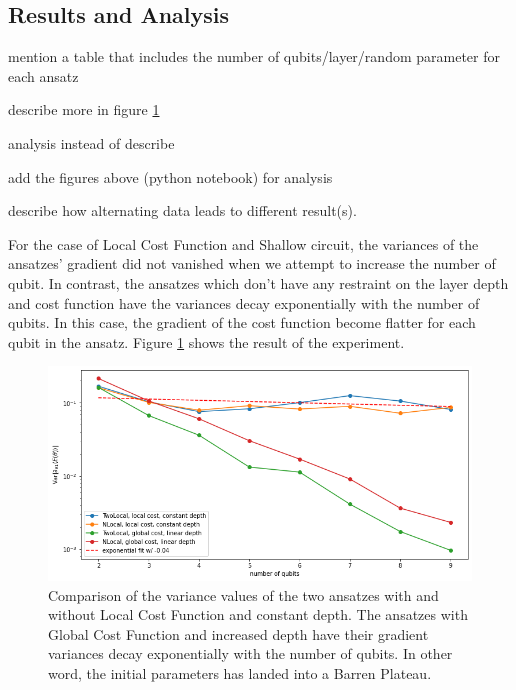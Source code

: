 \subsection{Results and Analysis}

\begin{todolist}
\item mention a table that includes the number of qubits/layer/random parameter for each ansatz
\item describe more in figure \ref{Variance Local Cost}
\item analysis instead of describe
\item add the figures above (python notebook) for analysis
\item describe how alternating data leads to different result(s).
\end{todolist}

For the case of Local Cost Function and Shallow circuit, the variances of the ansatzes' gradient did not vanished when we attempt to increase the number of qubit.
In contrast, the ansatzes which don't have any restraint on the layer depth and cost function have the variances decay exponentially with the number of qubits.
In this case, the gradient of the cost function become flatter for each qubit in the ansatz.
Figure \ref{Variance Local Cost} shows the result of the experiment.

\begin{figure}
    \includegraphics[width=\textwidth]{Artefact/Appendices/variancesLCF.png}
    \caption{
        Comparison of the variance values of the two ansatzes with and without Local Cost Function and constant depth.
        The ansatzes with Global Cost Function and increased depth have their gradient variances decay exponentially with the number of qubits. 
        In other word, the initial parameters has landed into a Barren Plateau.
    }
    \label{Variance Local Cost}
\end{figure}